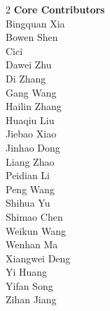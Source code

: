 \documentclass[11pt, a4paper, logo, copyright, nonumbering]{xiaomi}
\begin{document}
\begin{multicols}{2} %
\noindent
\textbf{\color{ourred} Core Contributors} \\
\color{ourred} Bingquan Xia \\
\color{ourred} Bowen Shen \\
\color{ourred} Cici \\
\color{ourred} Dawei Zhu \\
\color{ourred} Di Zhang \\
\color{ourred} Gang Wang \\
\color{ourred} Hailin Zhang \\
\color{ourred} Huaqiu Liu \\
\color{ourred} Jiebao Xiao \\
\color{ourred} Jinhao Dong \\
\color{ourred} Liang Zhao \\
\color{ourred} Peidian Li \\
\color{ourred} Peng Wang \\
\color{ourred} Shihua Yu \\
\color{ourred} Shimao Chen \\
\color{ourred} Weikun Wang \\
\color{ourred} Wenhan Ma \\
\color{ourred} Xiangwei Deng \\
\color{ourred} Yi Huang \\
\color{ourred} Yifan Song \\
\color{ourred} Zihan Jiang \\



\end{multicols}
\end{document}
